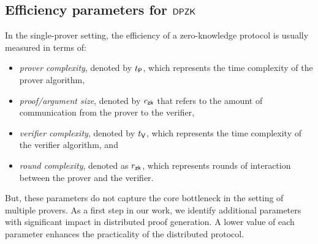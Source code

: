 \subsection{Efficiency parameters for $\mathsf{DPZK}$}\label{sec:efficiencyparams}
In the single-prover setting, the efficiency of a zero-knowledge protocol is usually measured in terms of: 
\begin{itemize}
\item {\em prover complexity}, denoted by $t_{\mathsf{P}}$, which represents the time
complexity of the prover algorithm,
\item {\em proof/argument size}, denoted by $c_\mathsf{zk}$ that refers to the amount
of communication from the prover to the verifier,
\item {\em verifier complexity}, denoted by $t_{\mathsf{V}}$, which represents the
time complexity of the verifier algorithm, and
\item {\em round complexity}, denoted as $r_\mathsf{zk}$, which represents rounds of interaction between the prover and the verifier. %
\end{itemize} 
But, these parameters do not capture the core bottleneck in the setting of multiple provers.  
As a first step in our work, we identify additional parameters with significant impact in distributed proof generation. A lower value of each parameter enhances the practicality of the
distributed protocol.

